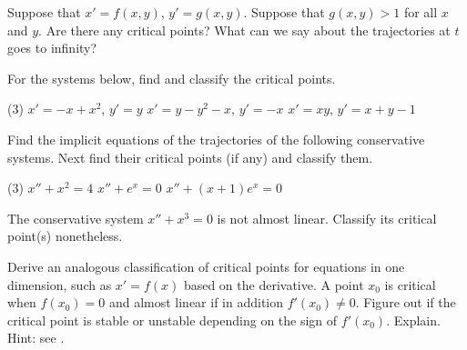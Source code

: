 \begin{exercise}
Suppose that $x' = f(x,y)$, $y' = g(x,y)$.  Suppose that $g(x,y) > 1$ for
all $x$ and $y$.  Are there any critical points?  What can we say about the
trajectories at $t$ goes to infinity?
\end{exercise}

\setcounter{exercise}{100}

\begin{exercise}
For the systems below, find and classify the critical points.
\begin{tasks}(3)
\task $x'=-x+x^2$, $y'=y$
\task $x'=y-y^2-x$, $y'=-x$
\task $x'=xy$, $y'=x+y-1$
\end{tasks}
\end{exercise}

\begin{exercise}
Find the implicit equations of the trajectories of the following
conservative systems.  Next find their critical points (if any) and classify them.
\begin{tasks}(3)
\task $x''+ x^2 = 4$
\task $x''+ e^x = 0$
\task $x''+ (x+1)e^x = 0$
\end{tasks}
\end{exercise}

\begin{exercise}
The conservative system $x''+x^3 = 0$ is not almost linear.  Classify
its critical point(s) nonetheless.
\end{exercise}

\begin{exercise}
Derive an analogous classification of critical points for equations in one dimension,
such as $x'= f(x)$ based on the derivative.  A point $x_0$ is critical when $f(x_0) = 0$ and
almost linear if in addition $f'(x_0) \not= 0$.  Figure out if the critical point is stable or unstable
depending on the sign of $f'(x_0)$.  Explain.  Hint: see .
\end{exercise}

